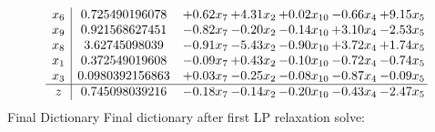 \documentclass[8pt]{article}
\begin{document}
 \[\begin{array}{c| c c@{\hskip 2pt} c@{\hskip 2pt} c@{\hskip 2pt} c@{\hskip 2pt} c@{\hskip 2pt} }
 x_{6}   &  0.725490196078 & +  0.62 x_{7} & +  4.31 x_{2} & +  0.02 x_{10} & -0.66 x_{4} & +  9.15 x_{5}\\
 x_{9}   &  0.921568627451 & -0.82 x_{7} & -0.20 x_{2} & -0.14 x_{10} & +  3.10 x_{4} & -2.53 x_{5}\\
 x_{8}   &  3.62745098039 & -0.91 x_{7} & -5.43 x_{2} & -0.90 x_{10} & +  3.72 x_{4} & +  1.74 x_{5}\\
 x_{1}   &  0.372549019608 & -0.09 x_{7} & +  0.43 x_{2} & -0.10 x_{10} & -0.72 x_{4} & -0.74 x_{5}\\
 x_{3}   &  0.0980392156863 & +  0.03 x_{7} & -0.25 x_{2} & -0.08 x_{10} & -0.87 x_{4} & -0.09 x_{5}\\
\hline
z    &  0.745098039216 & -0.18 x_{7} & -0.14 x_{2} & -0.20 x_{10} & -0.43 x_{4} & -2.47 x_{5}\\
\end{array}\]
Final Dictionary
Final dictionary after first LP relaxation solve: 
\end{document}
